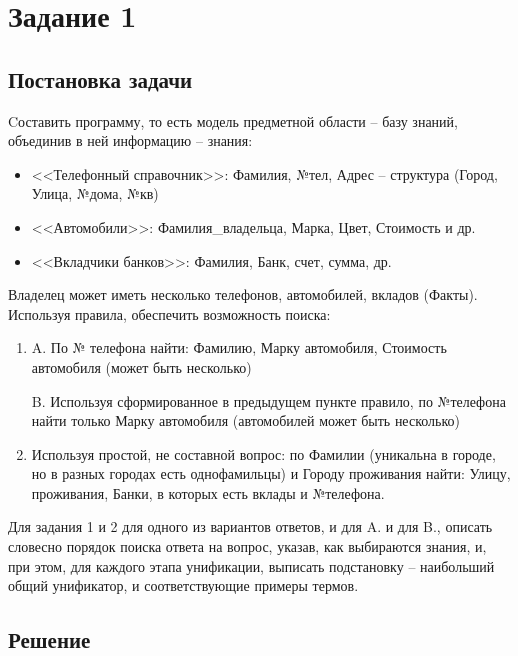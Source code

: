 \section*{Задание 1}
\subsection*{Постановка задачи}
Cоставить программу, то есть модель предметной области – базу знаний, объединив в ней информацию – знания:

\begin{itemize}
	\item <<Телефонный справочник>>: Фамилия, №тел, Адрес – структура (Город, Улица, №дома, №кв)
	\item <<Автомобили>>: Фамилия\_владельца, Марка, Цвет, Стоимость и др.
	\item <<Вкладчики банков>>: Фамилия, Банк, счет, сумма, др.
\end{itemize}


Владелец может иметь несколько телефонов, автомобилей, вкладов (Факты).
Используя правила, обеспечить возможность поиска:


\begin{enumerate}
	\item A. По № телефона найти: Фамилию, Марку автомобиля, Стоимость автомобиля (может быть несколько)
	
	B. Используя сформированное в предыдущем пункте правило, по №телефона найти только Марку автомобиля (автомобилей может быть несколько)
	
	\item Используя простой, не составной вопрос: по Фамилии (уникальна в городе, но в разных городах есть однофамильцы) и Городу проживания найти: Улицу, проживания, Банки, в которых есть вклады и №телефона.
\end{enumerate}

Для задания 1 и 2 для одного из вариантов ответов, и для A. и для B., описать словесно порядок поиска ответа на вопрос, указав, как выбираются знания, и, при этом, для каждого этапа унификации, выписать подстановку – наибольший общий унификатор, и соответствующие примеры термов.

\clearpage
\subsection*{Решение}



